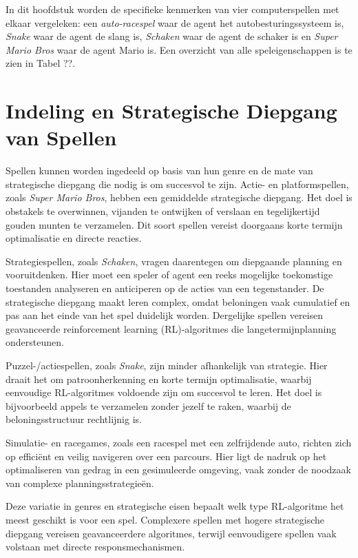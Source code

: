 \documentclass[a4paper,12pt]{report}
\begin{document}
In dit hoofdstuk worden de specifieke kenmerken van vier computerspellen met
elkaar vergeleken: een \textit{auto-racespel} waar de agent het
autobesturingssysteem is, \textit{Snake} waar de agent de slang is,
\textit{Schaken} waar de agent de schaker is en \textit{Super Mario Bros} waar
de agent Mario is. Een overzicht van alle speleigenschappen is te zien in Tabel
??.

\section{Indeling en Strategische Diepgang van Spellen} Spellen kunnen worden ingedeeld op basis van hun genre en de mate van
strategische diepgang die nodig is om succesvol te zijn. Actie- en
platformspellen, zoals \textit{Super Mario Bros}, hebben een gemiddelde
strategische diepgang. Het doel is obstakels te overwinnen, vijanden te
ontwijken of verslaan en tegelijkertijd gouden munten te verzamelen. Dit soort
spellen vereist doorgaans korte termijn optimalisatie en directe reacties.

Strategiespellen, zoals \textit{Schaken}, vragen daarentegen om diepgaande
planning en vooruitdenken. Hier moet een speler of agent een reeks mogelijke
toekomstige toestanden analyseren en anticiperen op de acties van een
tegenstander. De strategische diepgang maakt leren complex, omdat beloningen
vaak cumulatief en pas aan het einde van het spel duidelijk worden. Dergelijke
spellen vereisen geavanceerde reinforcement learning (RL)-algoritmes die
langetermijnplanning ondersteunen.

Puzzel-/actiespellen, zoals \textit{Snake}, zijn minder afhankelijk van
strategie. Hier draait het om patroonherkenning en korte termijn optimalisatie,
waarbij eenvoudige RL-algoritmes voldoende zijn om succesvol te leren. Het doel
is bijvoorbeeld appels te verzamelen zonder jezelf te raken, waarbij de
beloningsstructuur rechtlijnig is.

Simulatie- en racegames, zoals een racespel met een zelfrijdende auto, richten
zich op efficiënt en veilig navigeren over een parcours. Hier ligt de nadruk op
het optimaliseren van gedrag in een gesimuleerde omgeving, vaak zonder de
noodzaak van complexe planningsstrategieën.

Deze variatie in genres en strategische eisen bepaalt welk type RL-algoritme
het meest geschikt is voor een spel. Complexere spellen met hogere strategische
diepgang vereisen geavanceerdere algoritmes, terwijl eenvoudigere spellen vaak
volstaan met directe responsmechanismen.
\end{document}
